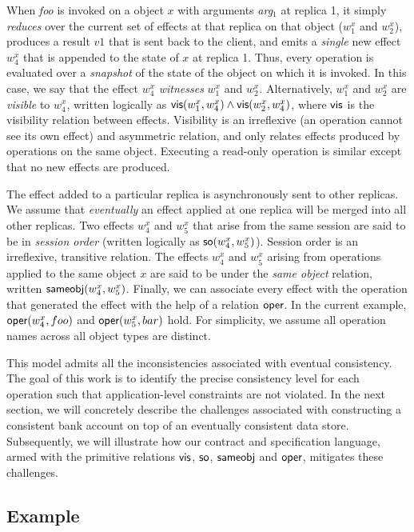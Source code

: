 When \emph{foo} is invoked on a object $x$ with arguments \emph{arg}$_1$ at
replica 1, it simply \emph{reduces} over the current set of effects at that
replica on that object ($w^x_1$ and $w^x_2$), produces a result $v1$ that is
sent back to the client, and emits a \emph{single} new effect $w^x_4$ that is
appended to the state of $x$ at replica 1. Thus, every operation is evaluated
over a \emph{snapshot} of the state of the object on which it is invoked. In
this case, we say that the effect $w^x_4$ \emph{witnesses} $w^x_1$ and $w^x_2$.
Alternatively, $w^x_1$ and $w^x_2$ are \emph{visible} to $w^x_4$, written
logically as ${\normalfont \textsf{vis}(w^x_1,w^x_4)} \wedge {\normalfont \textsf{vis}(w^x_2,w^x_4)}$, where ${\normalfont \textsf{vis}}$ is
the visibility relation between effects. Visibility is an irreflexive (an
operation cannot see its own effect) and asymmetric relation, and only relates
effects produced by operations on the same object. Executing a read-only
operation is similar except that no new effects are produced.

The effect added to a particular replica is asynchronously sent to other
replicas. We assume that \emph{eventually} an effect applied at one replica
will be merged into all other replicas. Two effects $w^x_4$ and $w^x_5$ that
arise from the same session are said to be in \emph{session order} (written
logically as ${\normalfont \textsf{so}(w^x_4,w^x_5)}$). Session order is an irreflexive, transitive
relation. The effects $w^x_4$ and $w^x_5$ arising from operations applied to
the same object $x$ are said to be under the \emph{same object} relation,
written ${\normalfont \textsf{sameobj}(w^x_4,w^x_5)}$. Finally, we can associate every effect with
the operation that generated the effect with the help of a relation ${\normalfont \textsf{oper}}$.
In the current example, ${\normalfont \textsf{oper}(w^x_4,foo)}$ and ${\normalfont \textsf{oper}(w^x_5,bar)}$ hold. For
simplicity, we assume all operation names across all object types are distinct.

This model admits all the inconsistencies associated with eventual consistency.
The goal of this work is to identify the precise consistency level for each
operation such that application-level constraints are not violated. In the next
section, we will concretely describe the challenges associated with
constructing a consistent bank account on top of an eventually consistent data
store. Subsequently, we will illustrate how our contract and specification
language, armed with the primitive relations ${\normalfont \textsf{vis}}$, ${\normalfont \textsf{so}}$, ${\normalfont \textsf{sameobj}}$ and
${\normalfont \textsf{oper}}$, mitigates these challenges.

\subsection{Example}

